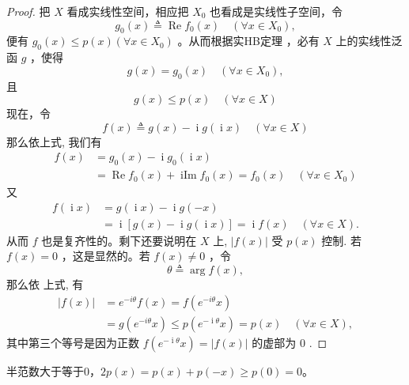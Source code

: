 \documentclass[lang=cn,newtx,10pt,scheme=chinese,thmcnt=chapter]{elegantbook}
\begin{document}
\begin{proof}
把 $X$ 看成实线性空间，相应把 $X _0$ 也看成是实线性子空间，令
\begin{equation*}
g_0(x) \triangleq \operatorname{Re} f_0(x) \quad\left(\forall x \in X _0\right),
\end{equation*}
便有 $g_0(x) \leqslant p(x)\left(\forall x \in X _0\right)$ 。从而根据实HB定理 ，必有 $X$ 上的实线性泛函 $g$ ，使得
\begin{equation*}
g(x)=g_0(x) \quad\left(\forall x \in X _0\right),
\end{equation*}
且
\begin{equation*}
g(x) \leqslant p(x) \quad(\forall x \in X )
\end{equation*}
现在，令
\begin{equation*}
f(x) \triangleq g(x)-\operatorname{i} g(\operatorname{i} x) \quad(\forall x \in X )
\end{equation*}
那么依上式, 我们有
\begin{equation*}
\begin{aligned}
f(x) & =g_0(x)-\operatorname{i} g_0(\operatorname{i} x) \\
& =\operatorname{Re} f_0(x)+\operatorname{iIm} f_0(x)=f_0(x) \quad\left(\forall x \in X _0\right)
\end{aligned}
\end{equation*}
又
\begin{equation*}
\begin{aligned}
f(\operatorname{i} x) & =g(\operatorname{i} x)-\operatorname{i} g(-x) \\
& =\operatorname{i}[g(x)-\operatorname{i} g(\operatorname{i} x)]=\operatorname{i} f(x) \quad(\forall x \in X ) .
\end{aligned}
\end{equation*}
从而 $f$ 也是复齐性的。剩下还要说明在 $X$ 上, $|f(x)|$ 受 $p(x)$ 控制. 若 $f(x)=0$ ，这是显然的。若 $f(x) \neq 0$ ，令
\begin{equation*}
\theta \triangleq \arg f(x),
\end{equation*}
那么依 上式, 有
\begin{equation*}
\begin{aligned}
|f(x)| & =e^{-i \theta} f(x)=f\left(e^{-i \theta} x\right) \\
& =g\left(e^{-i \theta} x\right) \leqslant p\left(e^{- \operatorname{i} \theta} x\right)=p(x) \quad(\forall x \in X ),
\end{aligned}
\end{equation*}
其中第三个等号是因为正数 $f\left( e ^{- \operatorname{i} \theta} x\right)=|f(x)|$ 的虚部为 0 .
\end{proof}
\begin{note}
    半范数大于等于0，$2p(x)=p(x)+p(-x)\geqslant p(0)=0$。
\end{note}
\end{document}
